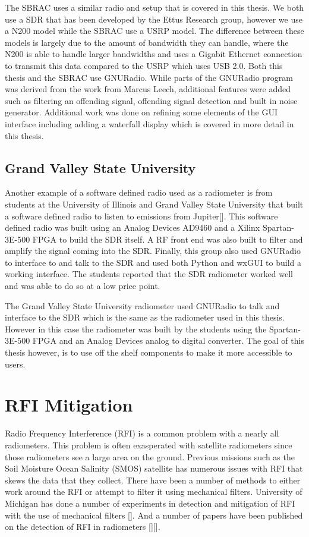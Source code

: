 The SBRAC uses a similar radio and setup that is covered in this thesis.  We both use a SDR that has been developed by the Ettus Research group, however we use a N200 model while the SBRAC use a USRP model.  The difference between these models is largely due to the amount of bandwidth they can handle, where the N200 is able to handle larger bandwidths and uses a Gigabit Ethernet connection to transmit this data compared to the USRP which uses USB 2.0.  Both this thesis and the SBRAC use GNURadio.  While parts of the GNURadio program was derived from the work from Marcus Leech, additional features were added such as filtering an offending signal, offending signal detection and built in noise generator.  Additional work was done on refining some elements of the GUI interface including adding a waterfall display which is covered in more detail in this thesis.

\subsection{Grand Valley State University}
Another example of a software defined radio used as a radiometer is from students at the University of Illinois and Grand Valley State University that built a software defined radio to listen to emissions from Jupiter[\cite{Behnke}].  This software defined radio was built using an Analog Devices AD9460 and a Xilinx Spartan-3E-500 FPGA to build the SDR itself.  A RF front end was also built to filter and amplify the signal coming into the SDR.  Finally, this group also used GNURadio to interface to and talk to the SDR and used both Python and wxGUI to build a working interface.  The students reported that the SDR radiometer worked well and was able to do so at a low price point.

The Grand Valley State University radiometer used GNURadio to talk and interface to the SDR which is the same as the radiometer used in this thesis.  However in this case the radiometer was built by the students using the Spartan-3E-500 FPGA and an Analog Devices analog to digital converter.  The goal of this thesis however, is to use off the shelf components to make it more accessible to users.  

\section{RFI Mitigation}
Radio Frequency Interference (RFI) is a common problem with a nearly all radiometers.  This problem is often exasperated with satellite radiometers since those radiometers see a large area on the ground.  Previous missions such as the Soil Moisture Ocean Salinity (SMOS) satellite has numerous issues with RFI that skews the data that they collect.  There have been a number of methods to either work around the RFI or attempt to filter it using mechanical filters.  University of Michigan has done a number of experiments in detection and mitigation of RFI with the use of mechanical filters [\cite{DeRooRFI}].  And a number of papers have been published on the detection of RFI in radiometers [\citep{DeRoo}][\cite{Forte}].

